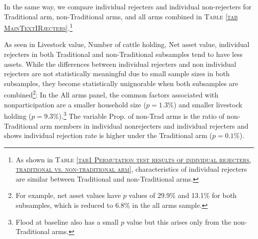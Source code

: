 	In the same way, we compare individual rejecters and individual non-rejecters for \textsf{Traditional} arm, non-\textsf{Traditional} arms, and all arms combined in \textsc{\normalsize Table \ref{tab MainTextIRjecters}}.\footnote{As shown in \textsc{Table \ref{tab1 Permutation test results of individual rejecters, traditional vs. non-traditional arm}}, characteristics of individual rejecters are similar between \textsf{Traditional} and non-\textsf{Traditional} arms. } 

	As seen in \textsf{Livestock value, Number of cattle holding, Net asset value}, individual rejecters in both \textsf{Traditional} and non-\textsf{Traditional} subsamples tend to have less assets. While the differences between individual rejecters and non individual rejecters are not statistically meaningful due to small sample sizes in both subsamples, they become statistically unignorable when both subsamples are combined\footnote{For example, net asset values have $p$ values of 29.9\% and 13.1\% for both subsamples, which is reduced to 6.8\% in the all arms sample. }: In the \textsf{All arms} panel, the common factors associated with nonparticipation are a smaller household size ($p=1.3\%$) and smaller livestock holding ($p=9.3\%$).\footnote{\textsf{Flood at baseline} also has a small $p$ value but this arises only from the non-\textsf{Traditional} arms. } The variable \textsf{Prop. of non-Trad arms} is the ratio of non-\textsf{Traditional} arm members in individual nonrejecters and individual rejecters and shows individual rejection rate is higher under the \textsf{Traditional} arm ($p=0.1\%$). %


